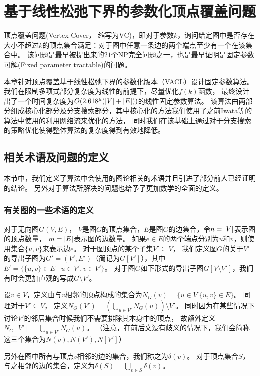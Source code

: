 \chapter{基于线性松弛下界的参数化顶点覆盖问题}
顶点覆盖问题(Vertex Cover， 缩写为VC)，即对于参数$k$，询问给定图中是否存在大小不超过$k$的顶点集合满足：对于图中任意一条边的两个端点至少有一个在该集合中。
该问题是最早被提出来的$21$个NP完全问题之一\cite{karp1972reducibility}，也是最早证明是固定参数可解(Fixed parameter tractable)的问题\cite{downey2012parameterized}。

本章针对顶点覆盖基于线性松弛下界的参数化版本（VACL）设计固定参数算法。
我们在限制多项式部分复杂度为线性的前提下，尽量优化$f(k)$函数，
最终设计出了一个时间复杂度为$O(2.618^{\mu}(\left\vert V \right\vert + \left\vert E \right\vert))$的线性固定参数算法。
该算法由两部分组成核心化部分及分支搜索部分，其中核心化的方法我们使用了之前Iwata等的算法中使用的利用网络流来优化的方法，
同时我们在该基础上通过对于分支搜索的策略优化使得整体算法的复杂度得到有效地降低。

\section{相关术语及问题的定义}
本节中，我们定义了算法中会使用的图论相关的术语并且引进了部分前人已经证明的结论。
另外对于算法所解决的问题也给予了更加数学的全面的定义。

\subsection{有关图的一些术语的定义}
对于无向图$G(V,E)$， $V$是图$G$的顶点集合，$E$是图$G$的边集合，令$n = \left\vert V \right\vert$表示图的顶点数量， $m = \left\vert E \right\vert$表示图的边数量。
如果$e \in E$的两个端点分别为$u$和$v$，则使用集合$\{u, v \}$来表示边$e$。
对于图顶点的某个子集$V' \subseteq V$， 我们定义图$G$的关于$V'$的导出子图为$G' = (V', E')$（简记为$G[V']$），其中$E' = \{\{u, v\} \in E\;|\;u \in V', v \in V' \}$。
对于图$G$如下形式的导出子图$G[V \setminus V']$，我们有时会更加直观的写成$G \setminus V'$。

设$v \in V$，定义由与$v$相邻的顶点构成的集合为$N_{G}(v) = \{ u \in V | \{u, v\} \in E\}$。
同理对于$V' \subseteq V$， 定义$N_{G}(V') = (\bigcup_{u \in V'}N_{G}(u)) \setminus V' $。
同时因为在某些情况下讨论$V'$的邻居集合时候我们不需要排除其本身中的顶点，
故额外定义$N_{G}[V'] = \bigcup_{u \in V'}N_{G}(u)$。
（注意，在前后文没有歧义的情况下，我们会简称这三个集合为$N(v), N(V'),N[V']$）

另外在图中所有与顶点$v$相邻的边的集合，我们称之为$\delta(v)$。
对于顶点集合$S$，与之相邻的边的集合，定义为$\delta(S) = \bigcup_{v \in S}\delta(v)$。


